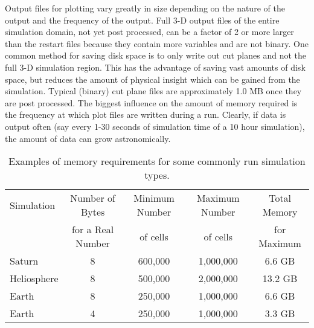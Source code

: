 Output files for plotting vary greatly in size depending on the nature of
the output and the frequency of the output.  Full 3-D output files of
the entire simulation domain, not yet post processed, can be
a factor of 2 or more larger than the restart files because they contain more
variables and are not binary.  
One common method for saving disk space is to only write out cut planes and not
the full 3-D simulation region.  This has the advantage of saving vast
amounts of disk space, but reduces the amount of physical insight
which can be gained from the simulation.  Typical (binary) cut plane
files are approximately 1.0 MB once they are post processed.  
The biggest influence on the amount of memory required is the frequency
at which plot files are written during a run.  Clearly, 
if data is output often (say every 1-30 seconds of simulation
time of a 10 hour simulation), the amount of data can grow astronomically.


\begin{table*}[t]

\caption{Examples of memory requirements for some commonly
run simulation types.}

\begin{centering}
{\small
\begin{tabular}{|l|c|c|c|c|} \hline

Simulation  & Number of  Bytes  & Minimum Number  & Maximum Number & Total Memory \\
            & for a Real Number & of cells        & of cells       & for Maximum  \\ 
\hline
Saturn      &  8                & 600,000         & 1,000,000      & 6.6 GB      \\
Heliosphere &  8                & 500,000         & 2,000,000      & 13.2 GB      \\
Earth       &  8                & 250,000         & 1,000,000      & 6.6 GB      \\ 
Earth       &  4                & 250,000         & 1,000,000      & 3.3 GB      \\ 
\hline

\end{tabular}}

\end{centering}

\label{tab:memory}
\end{table*} 

